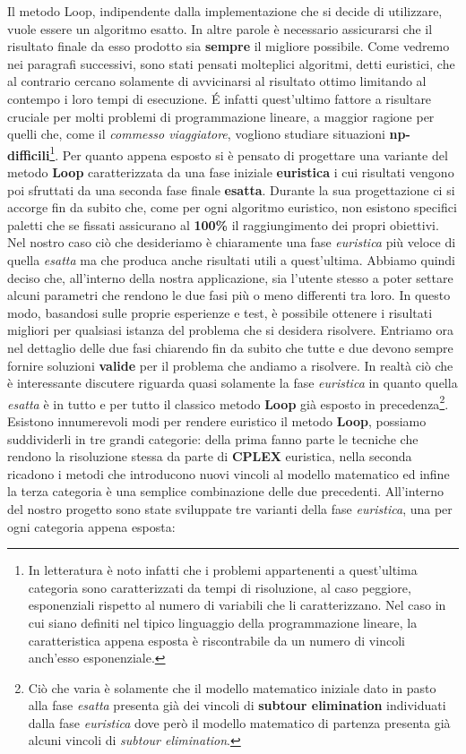 \documentclass[11pt]{article}
\begin{document}
Il metodo Loop, indipendente dalla implementazione che si decide di utilizzare, vuole essere un algoritmo esatto. In altre parole è necessario assicurarsi che il risultato finale da esso prodotto sia \textbf{sempre} il migliore possibile. Come vedremo nei paragrafi successivi, sono stati pensati molteplici algoritmi, detti euristici, che al contrario cercano solamente di avvicinarsi al risultato ottimo limitando al contempo i loro tempi di esecuzione.
\'E infatti quest'ultimo fattore a risultare cruciale per molti problemi di programmazione lineare, a maggior ragione per quelli che, come il \textit{commesso viaggiatore}, vogliono studiare situazioni \textbf{np-difficili}\footnote{In letteratura è noto infatti che i problemi appartenenti a quest'ultima categoria sono caratterizzati da tempi di risoluzione, al caso peggiore, esponenziali rispetto al numero di variabili che li caratterizzano. Nel caso in cui siano definiti nel tipico linguaggio della programmazione lineare, la caratteristica appena esposta è riscontrabile da un numero di vincoli anch'esso esponenziale.}.
Per quanto appena esposto si è pensato di progettare una variante del metodo \textbf{Loop} caratterizzata da una fase iniziale \textbf{euristica} i cui risultati vengono poi sfruttati da una seconda fase finale \textbf{esatta}. Durante la sua progettazione ci si accorge fin da subito che, come per ogni algoritmo euristico, non esistono specifici paletti che se fissati assicurano al \textbf{100\%} il raggiungimento dei propri obiettivi. Nel nostro caso ciò che desideriamo è chiaramente una fase \textit{euristica} più veloce di quella \textit{esatta} ma che produca anche risultati utili a quest'ultima. Abbiamo quindi deciso che, all'interno della nostra applicazione, sia l'utente stesso a poter settare alcuni parametri che rendono le due fasi più o meno differenti tra loro. In questo modo, basandosi sulle proprie esperienze e test, è possibile ottenere i risultati migliori per qualsiasi istanza del problema che si desidera risolvere.
Entriamo ora nel dettaglio delle due fasi chiarendo fin da subito che tutte e due devono sempre fornire soluzioni \textbf{valide} per il problema che andiamo a risolvere. In realtà ciò che è interessante discutere riguarda quasi solamente la fase \textit{euristica} in quanto quella \textit{esatta} è in tutto e per tutto il classico metodo \textbf{Loop} già esposto in precedenza\footnote{Ciò che varia è solamente che il modello matematico iniziale dato in pasto alla fase \textit{esatta} presenta già dei vincoli di \textbf{subtour elimination} individuati dalla fase \textit{euristica} dove però il modello matematico di partenza presenta già alcuni vincoli di \textit{subtour elimination}.}.
Esistono innumerevoli modi per rendere euristico il metodo \textbf{Loop}, possiamo suddividerli in tre grandi categorie: della prima fanno parte le tecniche che rendono la risoluzione stessa da parte di \textbf{CPLEX} euristica, nella seconda ricadono i metodi che introducono nuovi vincoli al modello matematico ed infine la terza categoria è una semplice combinazione delle due precedenti. All'interno del nostro progetto sono state sviluppate tre varianti della fase \textit{euristica}, una per ogni categoria appena esposta:
\end{document}
